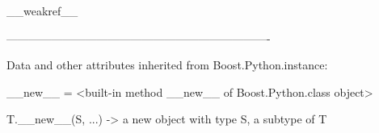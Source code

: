 \documentclass[letterpaper,10pt,english]{sphinxmanual}
\begin{document}
\begin{description}
\begin{description}
\begin{DUlineblock}{0em}
\item[] \_\_weakref\_\_
\item[] 
\item[] ----------------------------------------------------------------------
\item[] Data and other attributes inherited from Boost.Python.instance:
\item[] 
\item[] \_\_new\_\_ = \textless{}built-in method \_\_new\_\_ of Boost.Python.class object\textgreater{}
\item[]
\begin{DUlineblock}{\DUlineblockindent}
\item[] T.\_\_new\_\_(S, ...) -\textgreater{} a new object with type S, a subtype of T
\end{DUlineblock}
\end{DUlineblock}


\end{description}
\end{description}
\end{document}
